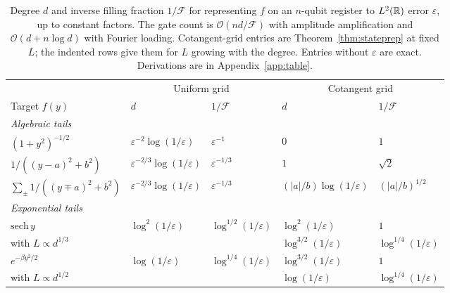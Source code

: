 \begin{table}[t]
	\caption{Degree $d$ and inverse filling fraction
		$1/\mathcal{F}$ for representing $f$ on an $n$-qubit
		register to $L^2(\mathbb{R})$ error $\varepsilon$, up to constant
		factors.  The gate count is $\mathcal{O}(nd/\mathcal{F})$
		with amplitude amplification and $\mathcal{O}(d+n\log d)$
		with Fourier loading.  Cotangent-grid entries are
		Theorem~\ref{thm:stateprep} at fixed $L$; the indented rows
		give them for $L$ growing with the degree.  Entries without
		$\varepsilon$ are exact.  Derivations are in
		Appendix~\ref{app:table}.}
	\label{tab:comparison}
	\begin{ruledtabular}
		\begin{tabular}{lllll}
			& \multicolumn{2}{c}{Uniform grid\footnotemark[1]}
			& \multicolumn{2}{c}{Cotangent grid}\\
			Target $f(y)$ & $d$ & $1/\mathcal{F}$
			& $d$ & $1/\mathcal{F}$\\
			\hline
			\multicolumn{5}{l}{\emph{Algebraic tails}}\\
			\quad$(1+y^2)^{-1/2}$
			& $\varepsilon^{-2}\log(1/\varepsilon)$
			& $\varepsilon^{-1}$ & $0$ & $1$\\
			\quad$1/((y-a)^2+b^2)$
			& $\varepsilon^{-2/3}\log(1/\varepsilon)$
			& $\varepsilon^{-1/3}$ & $1$ & $\sqrt2$\\
			\quad$\sum_{\pm}1/((y\mp a)^2+b^2)$\footnotemark[3]
			& $\varepsilon^{-2/3}\log(1/\varepsilon)$
			& $\varepsilon^{-1/3}$
			& $(|a|/b)\log(1/\varepsilon)$
			& $(|a|/b)^{1/2}$\\[3pt]
			\multicolumn{5}{l}{\emph{Exponential tails}}\\
			\quad$\mathrm{sech}\,y$
			& $\log^{2}(1/\varepsilon)$ & $\log^{1/2}(1/\varepsilon)$ & $\log^{2}(1/\varepsilon)$ & $1$\\
			\qquad with $L\propto d^{1/3}$
			& & & $\log^{3/2}(1/\varepsilon)$ & $\log^{1/4}(1/\varepsilon)$\\
			\quad$e^{-\beta y^2/2}$
			& $\log(1/\varepsilon)$\footnotemark[2] & $\log^{1/4}(1/\varepsilon)$ & $\log^{3/2}(1/\varepsilon)$ & $1$\\
			\qquad with $L\propto d^{1/2}$
			& & & $\log(1/\varepsilon)$ & $\log^{1/4}(1/\varepsilon)$
		\end{tabular}
	\end{ruledtabular}
\end{table}

